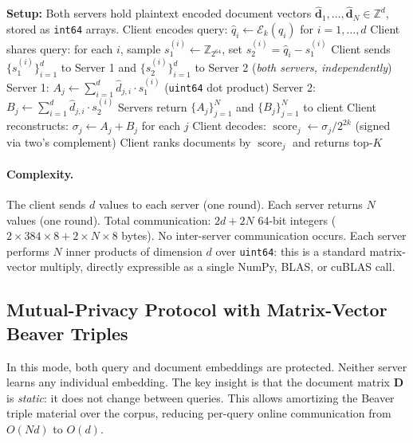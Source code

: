 \documentclass[11pt]{article}
\newcommand{\Z}{\mathbb{Z}}
\begin{document}
\begin{algorithm}[t]
\caption{Query-Private Similarity Search}
\label{alg:query-private}
\begin{algorithmic}[1]
\Statex \textbf{Setup:} Both servers hold plaintext encoded document vectors $\hat{\mathbf{d}}_1, \ldots, \hat{\mathbf{d}}_N \in \Z^d$, stored as \texttt{int64} arrays.
\Statex
\State Client encodes query: $\hat{q}_i \leftarrow \mathcal{E}_k(q_i)$ for $i = 1, \ldots, d$
\State Client shares query: for each $i$, sample $s_1^{(i)} \leftarrow \Z_{2^{64}}$, set $s_2^{(i)} = \hat{q}_i - s_1^{(i)}$
\State Client sends $\{s_1^{(i)}\}_{i=1}^d$ to Server 1 and $\{s_2^{(i)}\}_{i=1}^d$ to Server 2
 \hfill (\textit{both servers, independently})
    \State Server 1: $A_j \leftarrow \sum_{i=1}^{d} \hat{d}_{j,i} \cdot s_1^{(i)}$ \hfill (\texttt{uint64} dot product)
    \State Server 2: $B_j \leftarrow \sum_{i=1}^{d} \hat{d}_{j,i} \cdot s_2^{(i)}$
\EndFor
\State Servers return $\{A_j\}_{j=1}^N$ and $\{B_j\}_{j=1}^N$ to client
\State Client reconstructs: $\sigma_j \leftarrow A_j + B_j$ for each $j$
\State Client decodes: $\operatorname{score}_j \leftarrow \sigma_j / 2^{2k}$ \hfill (signed via two's complement)
\State Client ranks documents by $\operatorname{score}_j$ and returns top-$K$
\end{algorithmic}
\end{algorithm}

\paragraph{Complexity.} The client sends $d$ values to each server (one round). Each server returns $N$ values (one round). Total communication: $2d + 2N$ 64-bit integers ($2 \times 384 \times 8 + 2 \times N \times 8$ bytes). No inter-server communication occurs. Each server performs $N$ inner products of dimension $d$ over \texttt{uint64}: this is a standard matrix-vector multiply, directly expressible as a single NumPy, BLAS, or cuBLAS call.

\subsection{Mutual-Privacy Protocol with Matrix-Vector Beaver Triples}
\label{sec:matrix-beaver}

In this mode, both query and document embeddings are protected. Neither server learns any individual embedding. The key insight is that the document matrix $\mathbf{D}$ is \emph{static}: it does not change between queries. This allows amortizing the Beaver triple material over the corpus, reducing per-query online communication from $O(Nd)$ to $O(d)$.
\end{document}
